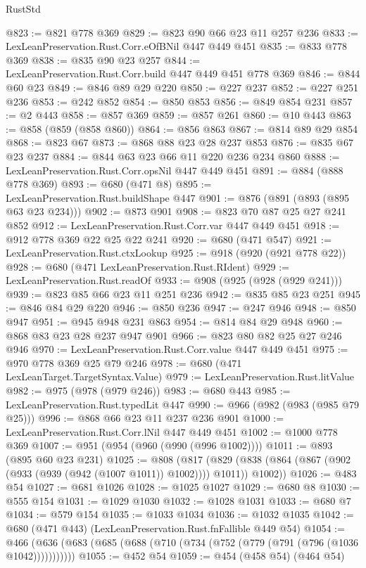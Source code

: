 \begin{lexlean}{RustStd}
\begin{coremodule}
@823 := @821 @778 @369
@829 := @823 @90 @66 @23 @11 @257 @236
@833 := LexLeanPreservation.Rust.Corr.eOfBNil @447 @449 @451
@835 := @833 @778 @369
@838 := @835 @90 @23 @257
@844 := LexLeanPreservation.Rust.Corr.build @447 @449 @451 @778 @369
@846 := @844 @60 @23
@849 := @846 @89 @29 @220
@850 := @227 @237
@852 := @227 @251 @236
@853 := @242 @852
@854 := @850 @853
@856 := @849 @854 @231
@857 := @2 @443
@858 := @857 @369
@859 := @857 @261
@860 := @10 @443
@863 := @858 (@859 (@858 @860))
@864 := @856 @863
@867 := @814 @89 @29 @854
@868 := @823 @67
@873 := @868 @88 @23 @28 @237 @853
@876 := @835 @67 @23 @237
@884 := @844 @63 @23 @66 @11 @220 @236 @234 @860
@888 := LexLeanPreservation.Rust.Corr.opsNil @447 @449 @451
@891 := @884 (@888 @778 @369)
@893 := @680 (@471 @8)
@895 := LexLeanPreservation.Rust.buildShape @447
@901 := @876 (@891 (@893 (@895 @63 @23 @234)))
@902 := @873 @901
@908 := @823 @70 @87 @25 @27 @241 @852
@912 := LexLeanPreservation.Rust.Corr.var @447 @449 @451
@918 := @912 @778 @369 @22 @25 @22 @241
@920 := @680 (@471 @547)
@921 := LexLeanPreservation.Rust.ctxLookup
@925 := @918 (@920 (@921 @778 @22))
@928 := @680 (@471 LexLeanPreservation.Rust.RIdent)
@929 := LexLeanPreservation.Rust.readOf
@933 := @908 (@925 (@928 (@929 @241)))
@939 := @823 @85 @66 @23 @11 @251 @236
@942 := @835 @85 @23 @251
@945 := @846 @84 @29 @220
@946 := @850 @236
@947 := @247 @946
@948 := @850 @947
@951 := @945 @948 @231 @863
@954 := @814 @84 @29 @948
@960 := @868 @83 @23 @28 @237 @947 @901
@966 := @823 @80 @82 @25 @27 @246 @946
@970 := LexLeanPreservation.Rust.Corr.value @447 @449 @451
@975 := @970 @778 @369 @25 @79 @246
@978 := @680 (@471 LexLeanTarget.TargetSyntax.Value)
@979 := LexLeanPreservation.Rust.litValue
@982 := @975 (@978 (@979 @246))
@983 := @680 @443
@985 := LexLeanPreservation.Rust.typedLit @447
@990 := @966 (@982 (@983 (@985 @79 @25)))
@996 := @868 @66 @23 @11 @237 @236 @901
@1000 := LexLeanPreservation.Rust.Corr.lNil @447 @449 @451
@1002 := @1000 @778 @369
@1007 := @951 (@954 (@960 (@990 (@996 @1002))))
@1011 := @893 (@895 @60 @23 @231)
@1025 := @808
    (@817 (@829 (@838 (@864 (@867 (@902 (@933 (@939 (@942 (@1007 @1011)) @1002)))) @1011)) @1002))
@1026 := @483 @54
@1027 := @681 @1026
@1028 := @1025 @1027
@1029 := @680 @8
@1030 := @555 @154
@1031 := @1029 @1030
@1032 := @1028 @1031
@1033 := @680 @7
@1034 := @579 @154
@1035 := @1033 @1034
@1036 := @1032 @1035
@1042 := @680 (@471 @443) (LexLeanPreservation.Rust.fnFallible @449 @54)
@1054 := @466 (@636 (@683 (@685 (@688 (@710 (@734 (@752 (@779 (@791 (@796 (@1036 @1042)))))))))))
@1055 := @452 @54
@1059 := @454 (@458 @54) (@464 @54)

\end{coremodule}
\end{lexlean}
